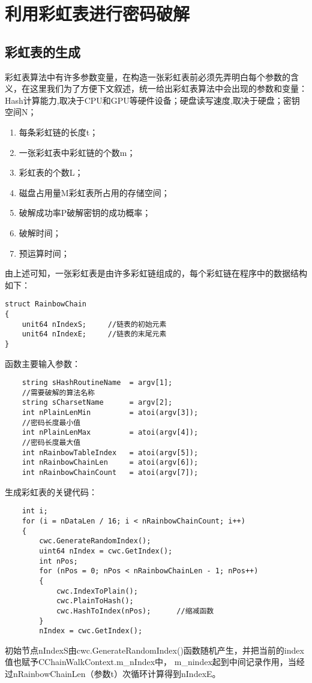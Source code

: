 \chapter{利用彩虹表进行密码破解}
\section{彩虹表的生成}
彩虹表算法中有许多参数变量，在构造一张彩虹表前必须先弄明白每个参数的含义，在这里我们为了方便下文叙述，统一给出彩虹表算法中会出现的参数和变量：Hash计算能力,取决于CPU和GPU等硬件设备；硬盘读写速度,取决于硬盘；密钥空间N；
\begin{enumerate}
\item 每条彩虹链的长度t；
\item 一张彩虹表中彩虹链的个数m；
\item 彩虹表的个数L；
\item 磁盘占用量M\quad 彩虹表所占用的存储空间；
\item 破解成功率P\quad 破解密钥的成功概率；
\item 破解时间；
\item 预运算时间；
\end{enumerate}
由上述可知，一张彩虹表是由许多彩虹链组成的，每个彩虹链在程序中的数据结构如下：\\
\begin{lstlisting}
struct RainbowChain 
{
	unit64 nIndexS;		//链表的初始元素
	unit64 nIndexE;		//链表的末尾元素
}
\end{lstlisting}
函数主要输入参数：
\begin{lstlisting}
	string sHashRoutineName  = argv[1];	
	//需要破解的算法名称
	string sCharsetName      = argv[2];				
	int nPlainLenMin         = atoi(argv[3]);
	//密码长度最小值
	int nPlainLenMax         = atoi(argv[4]);
	//密码长度最大值
	int nRainbowTableIndex   = atoi(argv[5]);			
	int nRainbowChainLen     = atoi(argv[6]);			
	int nRainbowChainCount   = atoi(argv[7]);			
\end{lstlisting}
生成彩虹表的关键代码：
\begin{lstlisting}
	int i;
	for (i = nDataLen / 16; i < nRainbowChainCount; i++) 
	{
		cwc.GenerateRandomIndex();
		uint64 nIndex = cwc.GetIndex();
		int nPos;
		for (nPos = 0; nPos < nRainbowChainLen - 1; nPos++)
		{
			cwc.IndexToPlain();
			cwc.PlainToHash();
			cwc.HashToIndex(nPos);		//缩减函数
		}
		nIndex = cwc.GetIndex();

\end{lstlisting}

初始节点nIndexS由cwc.GenerateRandomIndex()函数随机产生，并把当前的index值也赋予CChainWalkContext.m\_nIndex中， m\_nindex起到中间记录作用，当经过nRainbowChainLen（参数t）次循环计算得到nIndexE。

